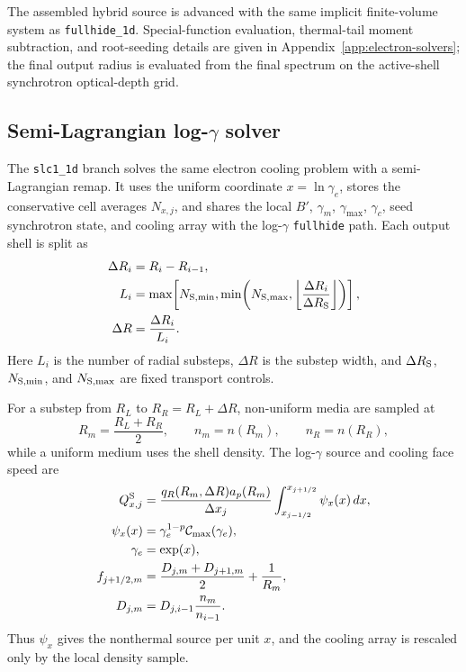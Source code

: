 \documentclass[twocolumn]{aastex702}
\begin{document}
The assembled hybrid source is advanced with the same implicit finite-volume
system as \texttt{fullhide\_1d}.  Special-function evaluation, thermal-tail
moment subtraction, and root-seeding details are given in
Appendix~\ref{app:electron-solvers}; the final output radius is evaluated from
the final spectrum on the active-shell synchrotron optical-depth grid.

\subsection{Semi-Lagrangian log-\texorpdfstring{\(\gamma\)}{gamma} solver}

The \texttt{slc1\_1d} branch solves the same electron cooling problem with a
semi-Lagrangian remap.  It uses the uniform coordinate
\(x=\ln\gamma_e\), stores the conservative cell averages \(N_{x,j}\), and
shares the local \(B'\), \(\gamma_m\), \(\gamma_{\max}\), \(\gamma_c\), seed
synchrotron state, and cooling array with the log-\(\gamma\) \texttt{fullhide}
path.  Each output shell is split as
\begin{equation}
\begin{aligned}
\Delta R_i&=R_i-R_{i-1},\\
L_i&=\max\!\left[
N_{\rm S,min},
\min\!\left(N_{\rm S,max},
\left\lfloor\frac{\Delta R_i}{\Delta R_{\rm S}}\right\rfloor\right)
\right],\\
\Delta R&=\frac{\Delta R_i}{L_i}.
\end{aligned}
\end{equation}
Here \(L_i\) is the number of radial substeps, \(\Delta R\) is the substep width,
and \(\Delta R_{\rm S}\), \(N_{\rm S,min}\), and \(N_{\rm S,max}\) are fixed
transport controls.

For a substep from \(R_L\) to \(R_R=R_L+\Delta R\), non-uniform media are sampled
at
\begin{equation}
R_m=\frac{R_L+R_R}{2},\qquad n_m=n(R_m),\qquad n_R=n(R_R),
\end{equation}
while a uniform medium uses the shell density.  The log-\(\gamma\) source and
cooling face speed are
\begin{equation}
\begin{aligned}
Q_{x,j}^{\rm S}&=
\frac{q_R(R_m,\Delta R)a_p(R_m)}{\Delta x_j}
\int_{x_{j-1/2}}^{x_{j+1/2}}
\psi_x(x)\,dx,\\
\psi_x(x)&=\gamma_e^{1-p}\mathcal C_{\max}(\gamma_e),\\
\gamma_e&=\exp(x),\\
f_{j+1/2,m}&=
\frac{D_{j,m}+D_{j+1,m}}{2}+\frac{1}{R_m},\\
D_{j,m}&=D_{j,i-1}\frac{n_m}{n_{i-1}} .
\end{aligned}
\end{equation}
Thus \(\psi_x\) gives the nonthermal source per unit \(x\), and the cooling array
is rescaled only by the local density sample.
\end{document}
